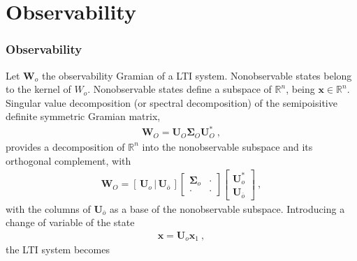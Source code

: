 \documentclass[letterpaper,10pt,english]{jupyterBook}
\begin{document}
\section{Observability}
\label{\detokenize{ch/system-theory/kalman-decomposition:observability}}\label{\detokenize{ch/system-theory/kalman-decomposition:system-theory-kalman-decomposition-observability}}\subsubsection*{Observability}

\sphinxAtStartPar
Let \(\mathbf{W}_o\) the observability Gramian of a LTI system. Non\sphinxhyphen{}observable states belong to the kernel of \(W_o\). Non\sphinxhyphen{}observable states define a sub\sphinxhyphen{}space of \(\mathbb{R}^n\), being \(\mathbf{x} \in \mathbb{R}^n\). Singular value decomposition (or spectral decomposition) of the semi\sphinxhyphen{}poisitive definite symmetric Gramian matrix,
\begin{equation*}
\begin{split}\mathbf{W}_O = \mathbf{U}_O \boldsymbol\Sigma_O \mathbf{U}_O^* \ ,\end{split}
\end{equation*}
\sphinxAtStartPar
provides a decomposition of \(\mathbb{R}^n\) into the non\sphinxhyphen{}observable sub\sphinxhyphen{}space and its orthogonal complement, with
\begin{equation*}
\begin{split}\mathbf{W}_O = [ \, \mathbf{U}_o \, | \, \mathbf{U}_{\overline{o}} \, ] \begin{bmatrix} \boldsymbol\Sigma_o & \cdot \\ \cdot & \cdot \end{bmatrix} \begin{bmatrix} \mathbf{U}_o^* \\ \mathbf{U}_{\overline{o}} \end{bmatrix} \ ,\end{split}
\end{equation*}
\sphinxAtStartPar
with the columns of \(\mathbf{U}_{\overline{o}}\) as a base of the non\sphinxhyphen{}observable sub\sphinxhyphen{}space. Introducing a change of variable of the state
\begin{equation*}
\begin{split}\mathbf{x} = \mathbf{U}_o \mathbf{x}_1 \ ,\end{split}
\end{equation*}
\sphinxAtStartPar
the LTI system becomes
\end{document}
